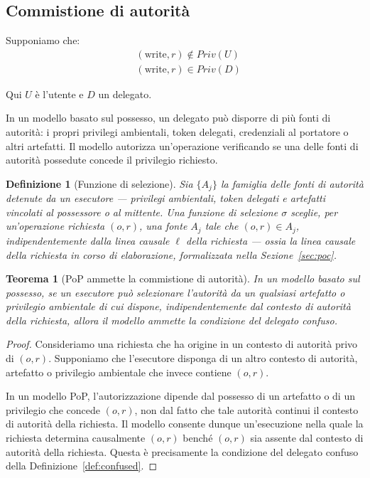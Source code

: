 \documentclass[11pt]{article}
\newtheorem{definition}{Definizione}
\newtheorem{theorem}{Teorema}
\begin{document}
\subsection{Commistione di autorità}

Supponiamo che:
\begin{align}
&(\text{write},r) \notin Priv(U) \tag{H1}\\
&(\text{write},r) \in Priv(D) \tag{H2}
\end{align}

Qui $U$ è l'utente e $D$ un delegato.

In un modello basato sul possesso, un delegato può disporre di più fonti di
autorità: i propri privilegi ambientali, token delegati, credenziali al
portatore o altri artefatti. Il modello autorizza un'operazione verificando se
una delle fonti di autorità possedute concede il privilegio richiesto.

\begin{definition}[Funzione di selezione]
Sia $\{A_j\}$ la famiglia delle fonti di autorità detenute da un esecutore ---
privilegi ambientali, token delegati e artefatti vincolati al possessore o al
mittente. Una \emph{funzione di selezione} $\sigma$ sceglie, per un'operazione
richiesta $(o,r)$, una fonte $A_j$ tale che $(o,r) \in A_j$, indipendentemente
dalla linea causale $\ell$ della richiesta --- ossia la linea causale della
richiesta in corso di elaborazione, formalizzata nella
Sezione~\ref{sec:poc}.
\end{definition}

\begin{theorem}[PoP ammette la commistione di autorità]
In un modello basato sul possesso, se un esecutore può selezionare l'autorità da
un qualsiasi artefatto o privilegio ambientale di cui dispone,
indipendentemente dal contesto di autorità della richiesta, allora il modello
ammette la condizione del delegato confuso.
\end{theorem}

\begin{proof}
Consideriamo una richiesta che ha origine in un contesto di autorità privo di
$(o,r)$. Supponiamo che l'esecutore disponga di un altro contesto di autorità,
artefatto o privilegio ambientale che invece contiene $(o,r)$.

In un modello PoP, l'autorizzazione dipende dal possesso di un artefatto o di un
privilegio che concede $(o,r)$, non dal fatto che tale autorità continui il
contesto di autorità della richiesta. Il modello consente dunque un'esecuzione
nella quale la richiesta determina causalmente $(o,r)$ benché $(o,r)$ sia
assente dal contesto di autorità della richiesta. Questa è precisamente la
condizione del delegato confuso della Definizione~\ref{def:confused}.
\end{proof}
\end{document}
